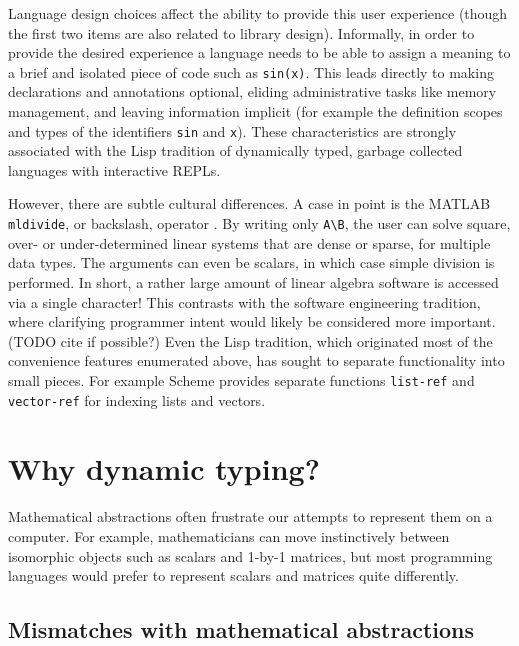 {Language design choices affect the ability to provide this
user experience (though the first two items are also related to
library design). Informally, in order to provide
the desired experience a language needs to be able to assign a
meaning to a brief and isolated piece of code such as \texttt{sin(x)}.
This leads directly to making declarations and annotations optional,
eliding administrative tasks like memory management, and leaving
information implicit (for example the definition scopes and types of the
identifiers \texttt{sin} and \texttt{x}).
These characteristics are strongly associated
with the Lisp tradition of dynamically typed, garbage collected
languages with interactive REPLs.

However, there are subtle cultural differences. A case in point is the
MATLAB \texttt{mldivide}, or backslash, operator \cite{matlabman:mldivide}.
By writing only \texttt{A\textbackslash B}, the user can solve square,
over- or under-determined linear systems that are dense or sparse, for multiple
data types. The arguments can even be scalars, in which case simple
division is performed. In short, a rather large amount of linear algebra
software is accessed via a single character! This contrasts with the
software engineering tradition, where clarifying programmer intent would
likely be considered more important. (TODO cite if possible?)
Even the Lisp tradition, which originated most of the convenience features
enumerated above, has sought to separate functionality into small pieces.
For example Scheme provides separate functions \texttt{list-ref} and
\texttt{vector-ref} \cite{schemelang} for indexing lists and vectors.



\section{Why dynamic typing?}

Mathematical abstractions often frustrate our attempts to represent them
on a computer. For example, mathematicians can move instinctively between
isomorphic objects such as scalars and 1-by-1 matrices, but most programming
languages would prefer to represent scalars and matrices quite differently.


\subsection{Mismatches with mathematical abstractions}

}
